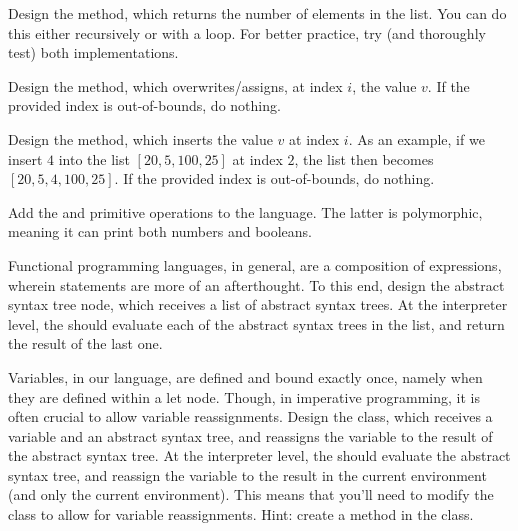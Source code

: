 Design the  method, which returns the number of elements in the list. You can do this either recursively or with a loop. For better practice, try (and thoroughly test) both implementations.

Design the  method, which overwrites/assigns, at index $i$, the value $v$. If the provided index is out-of-bounds, do nothing.

Design the  method, which inserts the value $v$ at index $i$. As an example, if we insert $4$ into the list $[20, 5, 100, 25]$ at index $2$, the list then becomes $[20, 5, 4, 100, 25]$. If the provided index is out-of-bounds, do nothing.

Add the  and  primitive operations to the language. The latter is polymorphic, meaning it can print both numbers and booleans.

Functional programming languages, in general, are a composition of expressions, wherein statements are more of an afterthought. To this end, design the  abstract syntax tree node, which receives a list of abstract syntax trees. At the interpreter level, the  should evaluate each of the abstract syntax trees in the list, and return the result of the last one.

Variables, in our language, are defined and bound exactly once, namely when they are defined within a let node. Though, in imperative programming, it is often crucial to allow variable reassignments. Design the  class, which receives a variable and an abstract syntax tree, and reassigns the variable to the result of the abstract syntax tree. At the interpreter level, the  should evaluate the abstract syntax tree, and reassign the variable to the result in the current environment (and only the current environment). This means that you'll need to modify the  class to allow for variable reassignments. Hint: create a  method in the  class.


